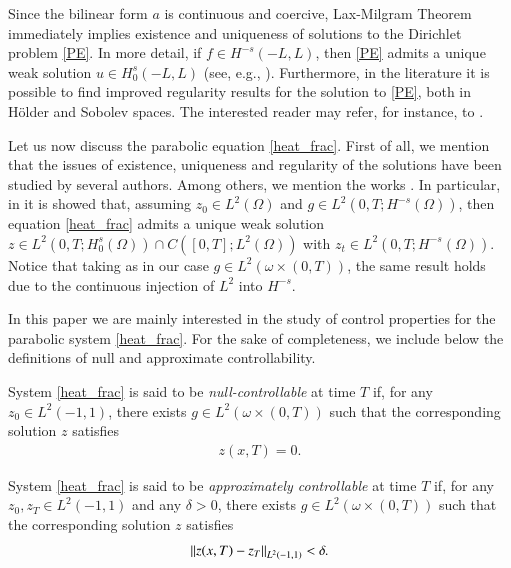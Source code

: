 Since the bilinear form $a$ is continuous and coercive, Lax-Milgram Theorem immediately implies existence and uniqueness of solutions to the Dirichlet problem \eqref{PE}. In more detail, if $f\in H^{-s}(-L,L)$, then \eqref{PE} admits a unique weak solution $u\in H_0^s(-L,L)$ (see, e.g., \cite[Proposition 2.1]{biccari2017local}). Furthermore, in the literature it is possible to find improved regularity results for the solution to \eqref{PE}, both in H\"older and Sobolev spaces. The interested reader may refer, for instance, to \cite{acosta2017fractional,biccari2017local,leonori2015basic,ros2014dirichlet,ros2014extremal}.

Let us now discuss the parabolic equation \eqref{heat_frac}. First of all, we mention that the issues of existence, uniqueness and regularity of the solutions have been studied by several authors. Among others, we mention the works \cite{biccari2017parabolic,fernandez2016boundary,leonori2015basic}. In particular, in \cite[Theorem 26]{leonori2015basic} it is showed that, assuming $z_0\in L^2(\Omega)$ and $g\in L^2(0,T;H^{-s}(\Omega))$, then equation \eqref{heat_frac} admits a unique weak solution $z\in L^2(0,T;H_0^s(\Omega))\cap C([0,T];L^2(\Omega))$ with $z_t\in L^2(0,T;H^{-s}(\Omega))$. Notice that taking as in our case $g\in L^2(\omega\times(0,T))$, the same result holds due to the continuous injection of $L^2$ into $H^{-s}$.

In this paper we are mainly interested in the study of control properties for the parabolic system \eqref{heat_frac}. For the sake of completeness, we include below the definitions of null and approximate controllability.

\begin{definition}
	System \eqref{heat_frac} is said to be \textit{null-controllable} at time $T$ if, for any $z_0\in L^2(-1,1)$, there exists $g\in L^2(\omega\times(0,T))$ such that the corresponding solution $z$ satisfies 
	\begin{align*}
		z(x,T)=0.
	\end{align*}
\end{definition}

\begin{definition}
	System \eqref{heat_frac} is said to be \textit{approximately controllable} at time $T$ if, for any $z_0,z_T\in L^2(-1,1)$ and any $\delta>0$, there exists $g\in L^2(\omega\times(0,T))$ such that the corresponding solution $z$ satisfies \begin{align*}
		{\left\|z(x,T)-z_T\right\|}_{L^2(-1,1)}<\delta.
	\end{align*}
\end{definition}

